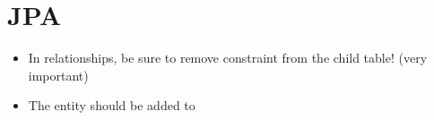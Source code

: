 \section{JPA}

\begin{itemize}
	\item In  relationships, be sure to remove  constraint from the child table! (very important)
	\item The entity should be added to 
\end{itemize}
